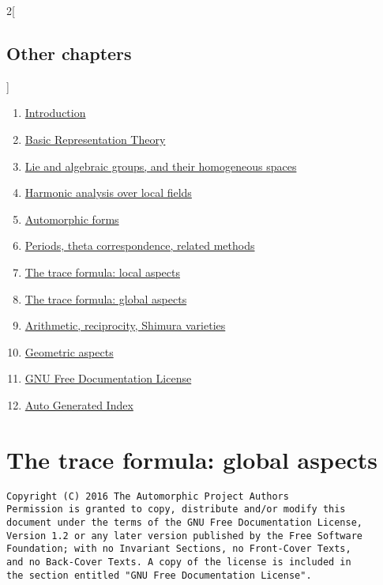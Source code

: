 \documentclass[oneside]{stacks-project-book}
\theoremstyle{plain}
\theoremstyle{definition}
\theoremstyle{remark}
\numberwithin{equation}{subsection}
\begin{document}
\begin{multicols}{2}[\section{Other chapters}]
\noindent
\begin{enumerate}
\item \hyperref[introduction-section-phantom]{Introduction}
\item \hyperref[representationtheory-section-phantom]{Basic Representation Theory}
\item \hyperref[algebraicgroups-section-phantom]{Lie and algebraic groups, and their homogeneous spaces}
\item \hyperref[harmonicanalysis-section-phantom]{Harmonic analysis over local fields}
\item \hyperref[automorphicforms-section-phantom]{Automorphic forms}
\item \hyperref[periods-section-phantom]{Periods, theta correspondence, related methods}
\item \hyperref[traceformulalocal-section-phantom]{The trace formula: local aspects}
\item \hyperref[traceformulaglobal-section-phantom]{The trace formula: global aspects}
\item \hyperref[arithmetic-section-phantom]{Arithmetic, reciprocity, Shimura varieties}
\item \hyperref[geometric-section-phantom]{Geometric aspects}
\item \hyperref[fdl-section-phantom]{GNU Free Documentation License}
\item \hyperref[index-section-phantom]{Auto Generated Index}
\end{enumerate}
\end{multicols}

%

\chapter{The trace formula: global aspects}



\label{traceformulaglobal-section-phantom}
\hypertarget{0700}{}
\reversemarginpar{}

\begin{verbatim}
Copyright (C) 2016 The Automorphic Project Authors
Permission is granted to copy, distribute and/or modify this
document under the terms of the GNU Free Documentation License,
Version 1.2 or any later version published by the Free Software
Foundation; with no Invariant Sections, no Front-Cover Texts,
and no Back-Cover Texts. A copy of the license is included in
the section entitled "GNU Free Documentation License".
\end{verbatim}
\end{document}
